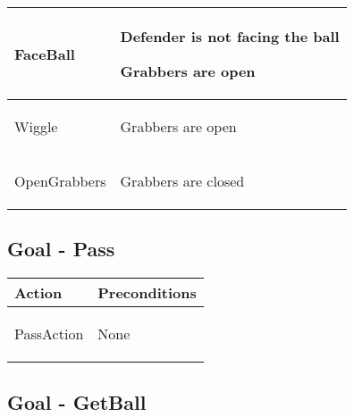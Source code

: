 \begin{center}
\begin{tabular}{ | >{\centering\arraybackslash}m{42mm} | >{\centering\arraybackslash}p{110mm} | }
FaceBall &
\begin{compactitem}
\item Defender is not facing the ball
\item Grabbers are open
\end{compactitem}  \\ \hline

Wiggle &
\begin{compactitem}
\item Grabbers are open
\end{compactitem}  \\ \hline

OpenGrabbers &
\begin{compactitem}
\item Grabbers are closed
\end{compactitem}  \\ \hline
\end{tabular}
\par
\bigskip

\end{center}


\subsection{Goal - Pass}

\begin{center}

\renewcommand{\arraystretch}{1.5}
\begin{tabular}{ | >{\centering\arraybackslash}m{42mm} | >{\centering\arraybackslash}p{110mm} | }
\hline
\textbf{Action} & \textbf{Preconditions} \\ \hline
PassAction &
\begin{compactitem}
\item None
\end{compactitem}  \\ \hline

\end{tabular}
\par
\bigskip

\end{center}


\pagebreak
\subsection{Goal - GetBall}

